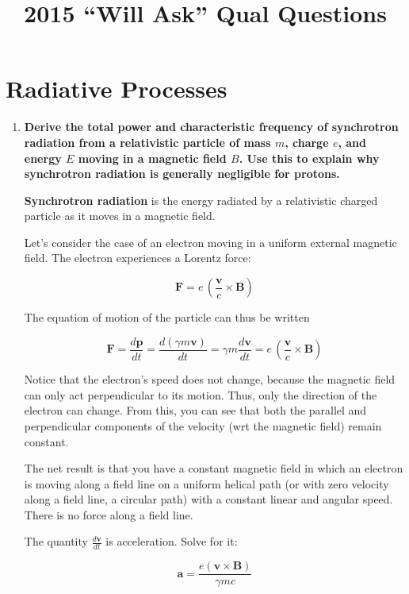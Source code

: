 \documentclass[12pt, letterpaper, preprint]{aastex}
\begin{document}
\title{2015 ``Will Ask'' Qual Questions}

\section*{Radiative Processes}

\begin{enumerate}

  \item \textbf{Derive the total power and characteristic frequency 
      of synchrotron radiation from a relativistic particle of mass $m$, 
      charge $e$, and energy $E$ moving in a magnetic field $B$. 
      Use this to explain why synchrotron radiation is generally 
      negligible for protons.}

\textbf{Synchrotron radiation} is the energy radiated by a relativistic 
charged particle as it moves in a magnetic field.

Let's consider the case of an electron moving in a uniform 
external magnetic field.
The electron experiences a Lorentz force:

\begin{equation}
  \textbf{F} = e \, (\frac{\mathbf{v}}{c} \times \mathbf{B})
  \label{lorentz-force}
\end{equation}

The equation of motion of the particle can thus be written

\begin{equation}
  \textbf{F} = \frac{d \mathbf{p}}{dt} = \frac{d (\gamma m \mathbf{v})}{dt}
  = \gamma m \frac{d \mathbf{v}}{dt} 
  = e \, (\frac{\mathbf{v}}{c} \times \mathbf{B})
  \label{eom}
\end{equation}

Notice that the electron's speed does not change, because
the magnetic field can only act perpendicular to its motion.
Thus, only the direction of the electron can change.
From this, you can see that both the parallel and perpendicular
components of the velocity (wrt the magnetic field) remain constant.

The net result is that you have a constant magnetic field in which
an electron is moving along a field line on a uniform helical path
(or with zero velocity along a field line, a circular path)
with a constant linear and angular speed. 
There is no force along a field line. 

The quantity $\frac{d\mathbf{v}}{dt}$ is acceleration.
Solve for it:

\begin{equation}
  \mathbf{a} = \frac{e (\mathbf{v} \times \mathbf{B})}{\gamma m c}
  \label{<++>}
\end{equation}


\end{enumerate}
\end{document}
